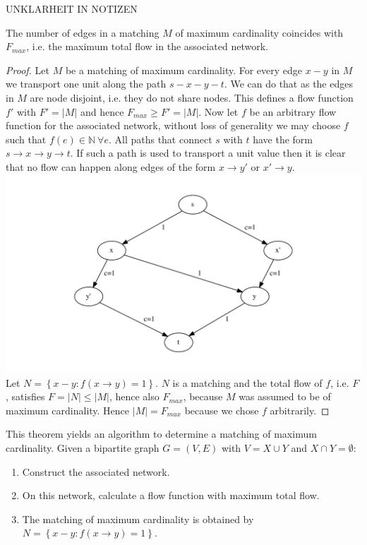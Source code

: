 UNKLARHEIT IN NOTIZEN
\begin{theorem}
The number of edges in a matching $M$ of maximum cardinality coincides with $F_{max}$, i.e. the
 maximum total flow in the associated network.
\end{theorem}
\begin{proof}
Let $M$ be a matching of maximum cardinality. For every edge $x-y$ in $M$ we transport one unit along
the path $s-x-y-t$. We can do that as the edges in $M$ are node disjoint, i.e. they do not share nodes.
This defines a flow function $f'$ with $F'=\lvert M \rvert$ and hence $F_{max}\ge F' = \lvert M \rvert$. 
Now let $f$ be an arbitrary flow function for the associated network, without loss of generality we may choose
$f$ such that $f(e)\in \mathbb{N} \: \forall e$. All paths that connect $s$ with $t$ have the form 
$s \rightarrow x \rightarrow y \rightarrow t$. If such a path is used to transport a unit value then it is clear that
no flow can happen along edges of the form $x \rightarrow y'$ or $x' \rightarrow y$.
\includegraphics[scale=0.6]{diagrams/Chapter4_Example4.pdf}\\
Let $N=\left\{x-y:f(x \rightarrow y)=1\right\}$. $N$ is a matching and the total flow of $f$, i.e. $F$, satisfies
$F=\lvert N \rvert \le \lvert M \rvert$, hence also $F_{max}$, because $M$ was assumed to be of maximum cardinality.
Hence $\lvert M \rvert=F_{max}$ because we chose $f$ arbitrarily. 
\end{proof}
This theorem yields an algorithm to determine
a matching of maximum cardinality. Given a bipartite graph $G=(V,E)$ with $V = X \cup Y$ and $X \cap Y = \emptyset$:
\begin{enumerate}
  \item Construct the associated network.
  \item On this network, calculate a flow function with maximum total flow.
  \item The matching of maximum cardinality is obtained by $N=\left\{x - y: f(x \rightarrow y) = 1\right\}$.
\end{enumerate}
